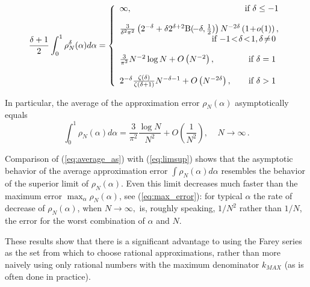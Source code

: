 \documentclass{esub2acm}
\begin{document}
\begin{equation}
\label{eq:moments}
{
\small
\frac{\delta+1}{2}
}
\int_0^1 \rho_N^{\delta} (\alpha) d \alpha =
\left\{\begin{array}{l}
    \infty{}, \hfill\mbox{if $ \delta \leq -1 $}\\
    \\
   \frac{3}{\delta^2 \pi^2 } \left(2^{-\delta} +
   \delta 2^{\delta+2} {\rm B}(\!-\delta,\frac{1}{2}) \right)
   N^{-2\delta}\left(1\! +\! o(1)\right), \\
   \hfill\mbox{if $-1\!<\!\delta\!<\!1, \delta\! \neq\! 0$ }\\
   \\
\frac{3}{\pi^2} N^{-2} \log N +
O\left( N^{-2} \right),
\hfill\mbox{if $\delta =1 $ }\\
\\
2^{-\delta}
\frac{\zeta(\delta)}{ \zeta(\delta+1)}
N^{-\delta-1}+
O\left( N^{-2\delta} \right),
                 \hfill  \mbox{if $\delta >1$ }
                  \end{array}
             \right.
\end{equation}

In particular, the average of the approximation error $\rho_N
(\alpha)$ asymptotically equals
\begin{equation}
\label{eq:average_as}
\int_{0}^1 \rho_N(\alpha) d\alpha = \frac{3}{\pi^2} \frac{\log N}{N^2} +
O\left(\frac{1}{N^2}\right),
\;\;\;\; N\rightarrow \infty \,.
\end{equation}

Comparison of (\ref{eq:average_as})
with (\ref{eq:limsup}) shows that the
asymptotic behavior of the average approximation error $\int
\rho_N(\alpha) d\alpha$
resembles the behavior of the superior limit of $\rho_N(\alpha)$.
Even this limit
decreases much faster than the maximum error $\max_{\alpha }
\rho_N(\alpha)$, see
(\ref{eq:max_error}): for typical $\alpha$ the rate of decrease of
$\rho_N(\alpha)$, when $ N\rightarrow \infty ,$
is, roughly speaking,  $1/N^2$ rather than $1/N$, the error for the
worst combination of $\alpha$ and $N$.

These results show that there is a significant advantage to using the Farey series
as the set from which to choose rational approximations, rather than
more naively using only rational numbers with the maximum
denominator $k_{MAX}$ (as is often done in practice).
\end{document}
